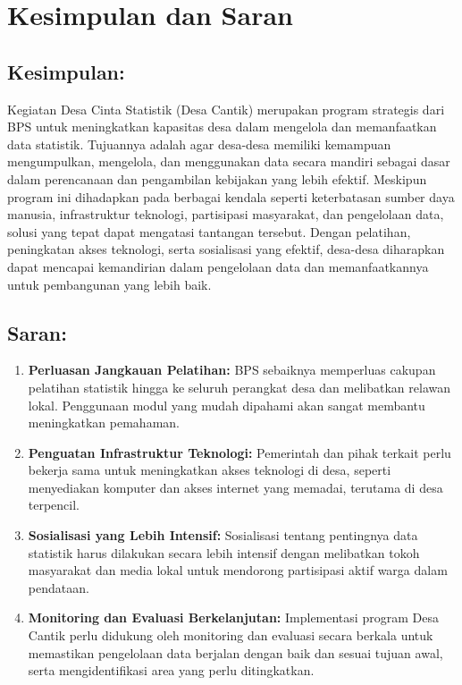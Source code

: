 \section{Kesimpulan dan Saran}

\subsection*{Kesimpulan:}

Kegiatan Desa Cinta Statistik (Desa Cantik) merupakan program strategis dari BPS untuk meningkatkan kapasitas desa dalam mengelola dan memanfaatkan data statistik. Tujuannya adalah agar desa-desa memiliki kemampuan mengumpulkan, mengelola, dan menggunakan data secara mandiri sebagai dasar dalam perencanaan dan pengambilan kebijakan yang lebih efektif. Meskipun program ini dihadapkan pada berbagai kendala seperti keterbatasan sumber daya manusia, infrastruktur teknologi, partisipasi masyarakat, dan pengelolaan data, solusi yang tepat dapat mengatasi tantangan tersebut. Dengan pelatihan, peningkatan akses teknologi, serta sosialisasi yang efektif, desa-desa diharapkan dapat mencapai kemandirian dalam pengelolaan data dan memanfaatkannya untuk pembangunan yang lebih baik.

\subsection*{Saran:}

\begin{enumerate}[label=\textbf{\textcolor{bpsnavy}{\arabic*.}}]
  \item \textbf{Perluasan Jangkauan Pelatihan:} BPS sebaiknya memperluas cakupan pelatihan statistik hingga ke seluruh perangkat desa dan melibatkan relawan lokal. Penggunaan modul yang mudah dipahami akan sangat membantu meningkatkan pemahaman.
  \item \textbf{Penguatan Infrastruktur Teknologi:} Pemerintah dan pihak terkait perlu bekerja sama untuk meningkatkan akses teknologi di desa, seperti menyediakan komputer dan akses internet yang memadai, terutama di desa terpencil.
  \item \textbf{Sosialisasi yang Lebih Intensif:} Sosialisasi tentang pentingnya data statistik harus dilakukan secara lebih intensif dengan melibatkan tokoh masyarakat dan media lokal untuk mendorong partisipasi aktif warga dalam pendataan.
  \item \textbf{Monitoring dan Evaluasi Berkelanjutan:} Implementasi program Desa Cantik perlu didukung oleh monitoring dan evaluasi secara berkala untuk memastikan pengelolaan data berjalan dengan baik dan sesuai tujuan awal, serta mengidentifikasi area yang perlu ditingkatkan.
\end{enumerate}

